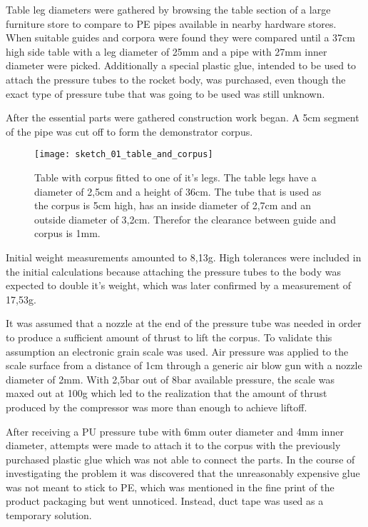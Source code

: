
Table leg diameters were gathered by browsing the table section of a large furniture store to compare to PE pipes available in nearby hardware stores. When suitable guides and corpora were found they were compared until a 37cm high side table \cite{table} with a leg diameter of 25mm and a pipe with 27mm inner diameter were picked. Additionally a special plastic glue, intended to be used to attach the pressure tubes to the rocket body, was purchased, even though the exact type of pressure tube that was going to be used was still unknown.

After the essential parts were gathered construction work began. A 5cm segment of the pipe was cut off to form the demonstrator corpus.

\begin{figure}[h]
\centering

\texttt{[image: sketch\_01\_table\_and\_corpus]}

\caption{Table with corpus fitted to one of it's legs. The table legs have a diameter of 2,5cm and a height of 36cm. The tube that is used as the corpus is 5cm high, has an inside diameter of 2,7cm and an outside diameter of 3,2cm. Therefor the clearance between guide and corpus is 1mm.}
\end{figure}


Initial weight measurements amounted to 8,13g. High tolerances were included in the initial calculations because attaching the pressure tubes to the body was expected to double it's weight, which was later confirmed by a measurement of 17,53g.

It was assumed that a nozzle at the end of the pressure tube was needed in order to produce a sufficient amount of thrust to lift the corpus.
To validate this assumption an electronic grain scale was used. Air pressure was applied to the scale surface from a distance of 1cm through a generic air blow gun with a nozzle diameter of 2mm. With 2,5bar out of 8bar available pressure, the scale was maxed out at 100g which led to the realization that the amount of thrust produced by the compressor was more than enough to achieve liftoff. 

After receiving a PU pressure tube with 6mm outer diameter and 4mm inner diameter, attempts were made to attach it to the corpus with the previously purchased plastic glue which was not able to connect the parts. In the course of investigating the problem it was discovered that the unreasonably expensive glue was not meant to stick to PE, which was mentioned in the fine print of the product packaging but went unnoticed. Instead, duct tape was used as a temporary solution. 

